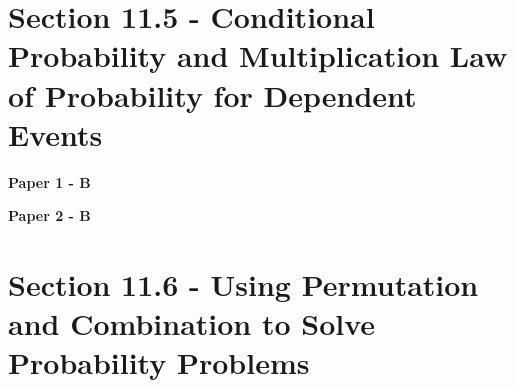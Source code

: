\documentclass[12pt, a4paper]{article}
\begin{document}
\section*{Section 11.5 - Conditional Probability and Multiplication Law of Probability for Dependent Events \NF}\label{section:5-11-5}

\textbf{Paper 1 - B}
\begin{enumx}[label=\arabic*.,start=8]
\item {}\label{DSE2014-CoreP1-Q19} 
\end{enumx}
\textbf{Paper 2 - B}
\begin{enumx}[label=\arabic*.,start=9]
\item {}\label{DSE2012-CoreP2-Q44} 
\item {}\label{DSE2019-CoreP2-Q43} 
\item {}\label{DSE2022-CoreP2-Q43} 
\item {}\label{DSE2023-CoreP2-Q43} 
\item {}\label{DSE2024-CoreP2-Q43} 
\end{enumx}




\section*{Section 11.6 - Using Permutation and Combination to Solve Probability Problems \NF}\label{section:5-11-6}
\end{document}
